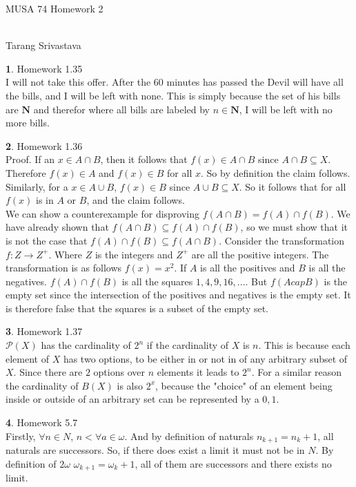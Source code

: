 \documentclass[10pt, twocolumn]{article}
\author{Tarang Srivastava}
\newcommand{\makechaptertitle}[1]{
\begin{center}
	\begin{large}
		#1
	\end{large}
	\begin{small}
		\\Tarang Srivastava
	\end{small}
\end{center}
}
\theoremstyle{definition}
\newtheorem{q}{}
\begin{document}
	
\makechaptertitle{MUSA 74 Homework 2}

\begin{q}
	Homework 1.35 \\
	I will not take this offer. After the 60 minutes has passed the Devil will have all the bills, and I will be left with none. This is simply because the set of his bills are $ \textbf{N} $ and therefor where all bills are labeled by $ n \in \textbf{N} $, I will be left with no more bills.
\end{q}
\begin{q}
	Homework 1.36 \\
	Proof. If an $ x \in A \cap B $, then it follows that $ f(x) \in A \cap B $ since $ A \cap B \subseteq X$. Therefore $ f(x) \in A $ and $ f(x) \in B $ for all $ x $. So by definition the claim follows. \\
	Similarly, for a $ x \in A \cup B $, $ f(x) \in B $ since $ A \cup B \subseteq X $. So it follows that for all $ f(x) $ is in $ A $ or $ B $, and the claim follows. \\
	We can show a counterexample for disproving $ f(A\cap B) = f(A) \cap f(B) $. We have already shown that $ f(A \cap B) \subseteq f(A) \cap f(B) $, so we must show that it is not the case that $ f(A) \cap f(B) \subseteq f(A \cap B) $. Consider the transformation $ f: Z \rightarrow Z^+ $. Where $ Z $ is the integers and $ Z^+ $ are all the positive integers. The transformation is as follows $ f(x) = x^2 $. If $ A $ is all the positives and $ B $ is all the negatives. $ f(A) \cap f(B) $ is all the squares $ {1, 4, 9, 16, ...} $. But $ f(A cap B) $ is the empty set since the intersection of the positives and negatives is the empty set. It is therefore false that the squares is a subset of the empty set.
\end{q}
\begin{q}
	Homework 1.37 \\
	$ \mathcal{P}(X) $ has the cardinality of $ 2^n $ if the cardinality of $ X $ is $ n $. This is because each element of $ X $ has two options, to be either in or not in of any arbitrary subset of $ X $. Since there are $ 2 $ options over $ n $ elements it leads to $ 2^n $. For a similar reason the cardinality of $ B(X) $ is also $ 2^x $, because the "choice" of an element being inside or outside of an arbitrary set can be represented by a $ {0, 1} $.
\end{q}
\begin{q}
	Homework 5.7 \\
	Firstly, $ \forall n \in N $, $ n < \forall a \in \omega $. And by definition of naturals $ n_{k+1} = n_k + 1 $, all naturals are successors. So, if there does exist a limit it must not be in $ N $. By definition of $ 2 \omega $ $ \omega_{k+1} = \omega_k + 1 $, all of them are successors and there exists no limit.
\end{q}
\end{document}
